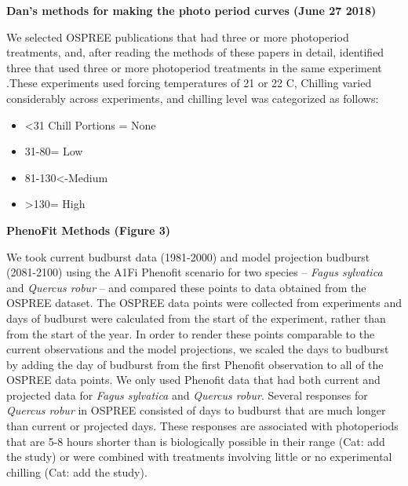 \documentclass{article}
\begin{document}
\par \textbf{Dan's methods for making the photo period curves (June 27 2018)}
\par We selected OSPREE publications that had three or more photoperiod treatments, and, after reading the methods of these papers in detail, identified three that used three or more photoperiod treatments in the same experiment \citep{heide93a,ashby62 andcafarra11b}.These experiments used forcing temperatures of 21 or 22 \degree C,  Chilling varied considerably across experiments, and chilling level was categorized as follows: 
\begin{itemize}
\item <31 Chill Portions = None
\item 31-80= Low
\item 81-130<-Medium 
\item>130= High
\end{itemize}

\par \textbf{PhenoFit Methods (Figure 3)}
\par We took current budburst data (1981-2000) and model projection budburst (2081-2100) using the A1Fi Phenofit scenario for two species -- \textit{Fagus sylvatica} and \textit{Quercus robur} -- and compared these points to data obtained from the OSPREE dataset. The OSPREE data points were collected from experiments and days of budburst were calculated from the start of the experiment, rather than from the start of the year. In order to render these points comparable to the current observations and the model projections, we scaled the days to budburst by adding the day of budburst from the first Phenofit observation to all of the OSPREE data points.  We only used Phenofit data that had both current and projected data for \textit{Fagus sylvatica} and \textit{Quercus robur}. Several responses for \textit{Quercus robur} in OSPREE consisted of days to budburst that are much longer than current or projected days. These responses are associated with photoperiods that are 5-8 hours shorter than is biologically possible in their range (Cat: add the study) or were combined with treatments involving little or no experimental chilling (Cat: add the study).
\end{document}
